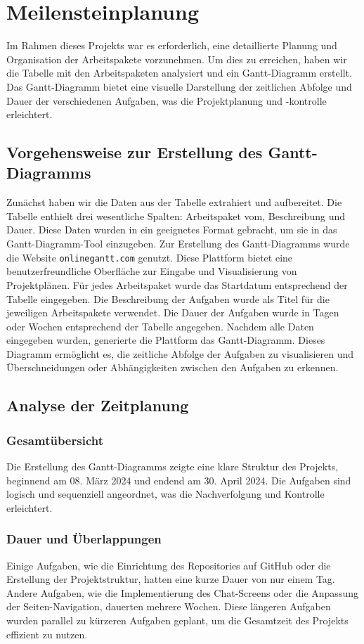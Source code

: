 \chapter{Meilensteinplanung}
Im Rahmen dieses Projekts war es erforderlich, eine detaillierte Planung und Organisation der Arbeitspakete vorzunehmen.
Um dies zu erreichen, haben wir die Tabelle mit den Arbeitspaketen analysiert und ein Gantt-Diagramm erstellt.
Das Gantt-Diagramm bietet eine visuelle Darstellung der zeitlichen Abfolge und Dauer der verschiedenen Aufgaben, was die Projektplanung und -kontrolle erleichtert.

\section{Vorgehensweise zur Erstellung des Gantt-Diagramms}
Zunächst haben wir die Daten aus der Tabelle extrahiert und aufbereitet.
Die Tabelle enthielt drei wesentliche Spalten: Arbeitspaket vom, Beschreibung und Dauer.
Diese Daten wurden in ein geeignetes Format gebracht, um sie in das Gantt-Diagramm-Tool einzugeben.
Zur Erstellung des Gantt-Diagramms wurde die Website \texttt{onlinegantt.com} genutzt.
Diese Plattform bietet eine benutzerfreundliche Oberfläche zur Eingabe und Visualisierung von Projektplänen.
Für jedes Arbeitspaket wurde das Startdatum entsprechend der Tabelle eingegeben.
Die Beschreibung der Aufgaben wurde als Titel für die jeweiligen Arbeitspakete verwendet.
Die Dauer der Aufgaben wurde in Tagen oder Wochen entsprechend der Tabelle angegeben.
Nachdem alle Daten eingegeben wurden, generierte die Plattform das Gantt-Diagramm.
Dieses Diagramm ermöglicht es, die zeitliche Abfolge der Aufgaben zu visualisieren und Überschneidungen oder Abhängigkeiten zwischen den Aufgaben zu erkennen.

\section{Analyse der Zeitplanung}
\subsection{Gesamtübersicht}
Die Erstellung des Gantt-Diagramms zeigte eine klare Struktur des Projekts, beginnend am 08. März 2024 und endend am 30. April 2024.
Die Aufgaben sind logisch und sequenziell angeordnet, was die Nachverfolgung und Kontrolle erleichtert.

\subsection{Dauer und Überlappungen}
Einige Aufgaben, wie die Einrichtung des Repositories auf GitHub oder die Erstellung der Projektstruktur, hatten eine kurze Dauer von nur einem Tag.
Andere Aufgaben, wie die Implementierung des Chat-Screens oder die Anpassung der Seiten-Navigation, dauerten mehrere Wochen.
Diese längeren Aufgaben wurden parallel zu kürzeren Aufgaben geplant, um die Gesamtzeit des Projekts effizient zu nutzen.

